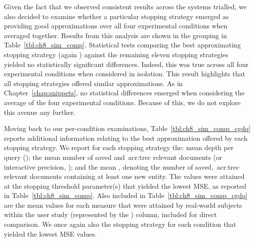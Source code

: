 Given the fact that we observed consistent results across the systems trialled, we also decided to examine whether a particular stopping strategy emerged as providing good approximations over all four experimental conditions when averaged together. Results from this analysis are shown in the  grouping in Table~\ref{tbl:ch8_sim_comp}. Statistical tests comparing the best approximating stopping strategy (again ) against the remaining eleven stopping strategies yielded no statistically significant differences. Indeed, this was true across all four experimental conditions when considered in isolation. This result highlights that all stopping strategies offered similar approximations. As in Chapter~\ref{chap:snippets}, no statistical differences emerged when considering the average of the four experimental conditions. Because of this, we do not explore this avenue any further.

Moving back to our per-condition examinations, Table~\ref{tbl:ch8_sim_comp_cgdq} reports additional information relating to the best approximation offered by each stopping strategy. We report for each stopping strategy the: mean depth per query (); the mean number of saved and~\gls{acr:trec} relevant documents (or interactive precision, ); and the mean , denoting the number of saved,~\gls{acr:trec} relevant documents containing at least one new entity. The values were attained at the stopping threshold parameter(s) that yielded the lowest MSE, as reported in Table~\ref{tbl:ch8_sim_comp}. Also included in Table~\ref{tbl:ch8_sim_comp_cgdq} are the mean values for each measure that were attained by real-world subjects within the user study (represented by the ) column, included for direct comparison. We once again also  the stopping strategy for each condition that yielded the lowest MSE values.

